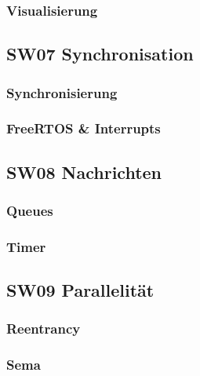 \documentclass[
  10pt,
  a4paper,
]{article}
\numberwithin{equation}{section}
\begin{document}
\hypertarget{visualisierung}{%
\subsubsection{Visualisierung}\label{visualisierung}}

\hypertarget{sw07-synchronisation}{%
\subsection{SW07 Synchronisation}\label{sw07-synchronisation}}

\hypertarget{synchronisierung}{%
\subsubsection{Synchronisierung}\label{synchronisierung}}

\hypertarget{freertos-interrupts}{%
\subsubsection{FreeRTOS \& Interrupts}\label{freertos-interrupts}}

\hypertarget{sw08-nachrichten}{%
\subsection{SW08 Nachrichten}\label{sw08-nachrichten}}

\hypertarget{queues}{%
\subsubsection{Queues}\label{queues}}

\hypertarget{timer}{%
\subsubsection{Timer}\label{timer}}

\hypertarget{sw09-parallelituxe4t}{%
\subsection{SW09 Parallelität}\label{sw09-parallelituxe4t}}

\hypertarget{reentrancy}{%
\subsubsection{Reentrancy}\label{reentrancy}}

\hypertarget{sema}{%
\subsubsection{Sema}\label{sema}}
\end{document}
